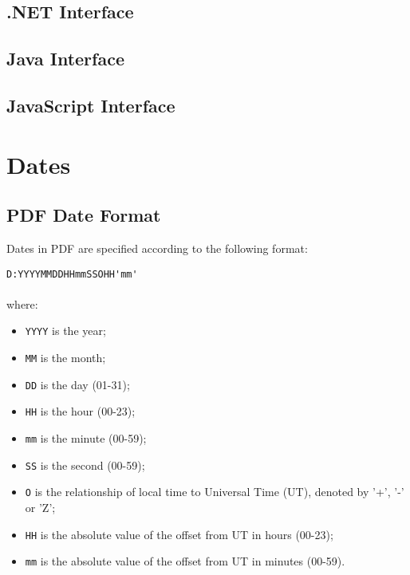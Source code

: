 \documentclass{book}
\begin{document}
\begin{dotnetcpdflib}
\clearpage
\section*{.NET Interface}
\begin{small}\tt

\end{small}
\end{dotnetcpdflib}

\begin{jcpdflib}
\clearpage
\section*{Java Interface}
\begin{small}\tt

\end{small}
\end{jcpdflib}

\begin{jscpdflib}
\clearpage
\section*{JavaScript Interface}
\begin{small}\tt

\end{small}
\end{jscpdflib}

\appendix
\chapter{Dates}\pagestyle{empty}
\label{dates}

\section{PDF Date Format}
Dates in PDF are specified according to the following format:

\begin{framed}
\verb!D:YYYYMMDDHHmmSSOHH'mm'!\\\\where:

\begin{itemize}
  \item \texttt{YYYY} is the year;
  \item \texttt{MM} is the month;
  \item \texttt{DD} is the day (01-31);
  \item \texttt{HH} is the hour (00-23);
  \item \texttt{mm} is the minute (00-59);
  \item \texttt{SS} is the second (00-59);
  \item \texttt{O} is the relationship of local time to Universal Time (UT), denoted by '+', '-' or 'Z';
  \item \texttt{HH} is the absolute value of the offset from UT in hours (00-23);
  \item \texttt{mm} is the absolute value of the offset from UT in minutes (00-59).
\end{itemize}
\end{framed}
\end{document}
